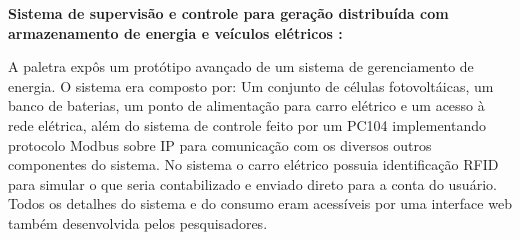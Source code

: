 
\textbf{Sistema de supervisão e controle para geração distribuída com
armazenamento de energia e veículos elétricos :}

A paletra expôs um protótipo avançado de um sistema de gerenciamento de energia.
O sistema era composto por: Um conjunto de células fotovoltáicas, um banco de
baterias, um ponto de alimentação para carro elétrico e um acesso à rede
elétrica, além do sistema de controle feito por um PC104 implementando protocolo
Modbus sobre IP para comunicação com os diversos outros componentes do sistema.
No sistema o carro elétrico possuia identificação RFID para simular o que seria
contabilizado e enviado direto para a conta do usuário. Todos os detalhes do
sistema e do consumo eram acessíveis por uma interface web também desenvolvida
pelos pesquisadores.
